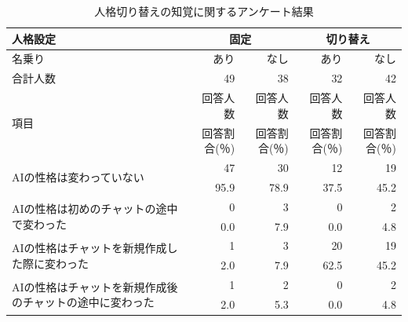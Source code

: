 \documentclass[10pt,twocolumn]{jsarticle}
\begin{document}
\begin{table}[htbp]
    \centering
    \caption{人格切り替えの知覚に関するアンケート結果}
    \label{tab:total_result}
    \renewcommand{\arraystretch}{1.2}
    \footnotesize %
    \setlength{\tabcolsep}{1mm} %

    \begin{tabularx}{\textwidth}{Xrrrr}
        \hline
        \multicolumn{1}{l}{人格設定} & \multicolumn{2}{c}{固定} & \multicolumn{2}{c}{切り替え}\\
        \hline
        \multicolumn{1}{l}{名乗り} & あり & なし & あり & なし \\
        \hline
        \multirow{1}{*}{合計人数} & 49 & 38 & 32 & 42 \\
        \hline
        
        \multirow{2}{*}{項目} & 回答人数 & 回答人数 & 回答人数 & 回答人数\\
         & 回答割合(％) & 回答割合(％)& 回答割合(％) & 回答割合(％) \\
        \hline

        \multirow{2}{*}{AIの性格は変わっていない} & 47 & 30 & 12 & 19 \\
         & 95.9 & 78.9 & 37.5 & 45.2 \\ 
        
        \multirow{2}{*}{AIの性格は初めのチャットの途中で変わった} & 0 & 3 & 0 & 2 \\
         & 0.0 & 7.9 & 0.0 & 4.8 \\ 
        
        \multirow{2}{*}{AIの性格はチャットを新規作成した際に変わった} & 1 & 3 & 20 & 19 \\
         & 2.0 & 7.9 & 62.5 & 45.2 \\ 
        
        \multirow{2}{*}{AIの性格はチャットを新規作成後のチャットの途中に変わった} & 1 & 2 & 0 & 2 \\
         & 2.0 & 5.3 & 0.0 & 4.8 \\ 
        \hline
    \end{tabularx}
\end{table}


\end{document}
